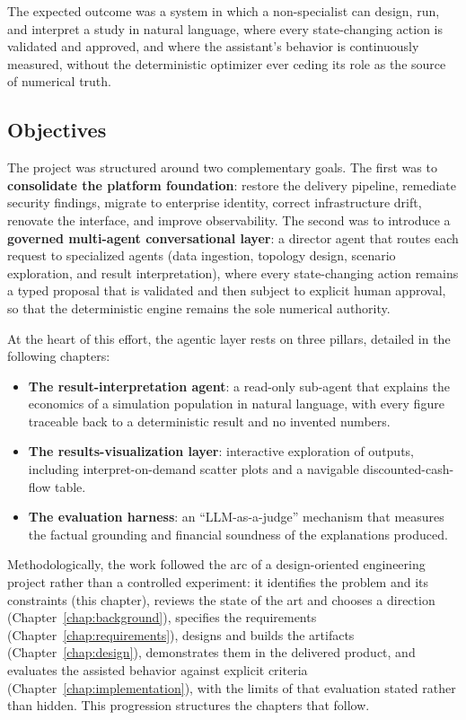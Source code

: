 The expected outcome was a system in which a non-specialist can design, run, and
interpret a study in natural language, where every state-changing action is
validated and approved, and where the assistant's behavior is continuously
measured, without the deterministic optimizer ever ceding its role as the source
of numerical truth.

\subsection{Objectives}
\label{sec:objectives}

The project was structured around two complementary goals. The first was to
\textbf{consolidate the platform foundation}: restore the delivery pipeline,
remediate security findings, migrate to enterprise identity, correct
infrastructure drift, renovate the interface, and improve observability. The
second was to introduce a \textbf{governed multi-agent conversational layer}: a
director agent that routes each request to specialized agents (data ingestion,
topology design, scenario exploration, and result interpretation), where every
state-changing action remains a typed proposal that is validated and then
subject to explicit human approval, so that the deterministic engine remains the
sole numerical authority.

At the heart of this effort, the agentic layer rests on three pillars,
detailed in the following chapters:

\begin{itemize}
  \item \textbf{The result-interpretation agent}: a read-only sub-agent that
    explains the economics of a simulation population in natural language, with
    every figure traceable back to a deterministic result and no invented
    numbers.
  \item \textbf{The results-visualization layer}: interactive exploration of
    outputs, including interpret-on-demand scatter plots and a navigable
    discounted-cash-flow table.
  \item \textbf{The evaluation harness}: an ``LLM-as-a-judge'' mechanism that
    measures the factual grounding and financial soundness of the explanations
    produced.
\end{itemize}

Methodologically, the work followed the arc of a design-oriented engineering
project rather than a controlled experiment: it identifies the problem and its
constraints (this chapter), reviews the state of the art and chooses a direction
(Chapter~\ref{chap:background}), specifies the requirements
(Chapter~\ref{chap:requirements}), designs and builds the artifacts
(Chapter~\ref{chap:design}), demonstrates them in the delivered product, and
evaluates the assisted behavior against explicit criteria
(Chapter~\ref{chap:implementation}), with the limits of that evaluation stated
rather than hidden. This progression structures the chapters that follow.

